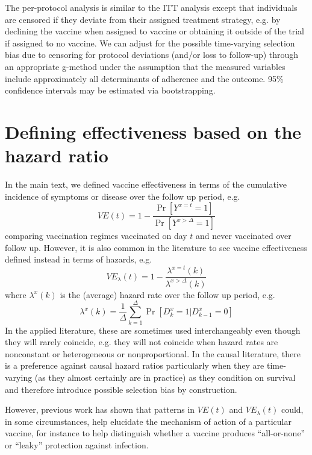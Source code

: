 \begin{appendices}
\begin{refsection}
    The per-protocol analysis is similar to the ITT analysis except that individuals are censored if they deviate from their assigned treatment strategy, e.g. by declining the vaccine when assigned to vaccine or obtaining it outside of the trial if assigned to no vaccine. We can adjust for the possible time-varying selection bias due to censoring for protocol deviations (and/or loss to follow-up) through an appropriate g-method under the assumption that the measured variables include approximately all determinants of adherence and the outcome. 95\% confidence intervals may be estimated via bootstrapping. 
    \clearpage

    \section{Defining effectiveness based on the hazard ratio} \label{sec:effect_measures}
    In the main text, we defined vaccine effectiveness in terms of the cumulative incidence of symptoms or disease over the follow up period, e.g.
    $$
    VE(t) = 1 - \frac{\Pr[Y^{x=t} = 1]}{\Pr[Y^{x > \Delta} = 1]}
    $$ 
    comparing vaccination regimes vaccinated on day $t$ and never vaccinated over follow up. However, it is also common in the literature to see vaccine effectiveness defined instead in terms of hazards, e.g.
    $$
    VE_\lambda(t) = 1 - \frac{\lambda^{x=t}(k)}{\lambda^{x > \Delta}(k)}
    $$ 
    where $\lambda^x(k)$ is the (average) hazard rate over the follow up period, e.g.
    $$
    \lambda^x(k) = \frac{1}{\Delta}\sum_{k=1}^{\Delta}\Pr[D_k^{x} = 1 | D_{k-1}^{x} = 0]
    $$ 
    In the applied literature, these are sometimes used interchangeably even though they will rarely coincide, e.g. they will not coincide when hazard rates are nonconstant or heterogeneous or nonproportional. In the causal literature, there is a preference against causal hazard ratios particularly when they are time-varying (as they almost certainly are in practice) as they condition on survival and therefore introduce possible selection bias by construction. 

    However, previous work \cite{smith_assessment_1984} has shown that patterns in $VE(t)$ and $VE_\lambda(t)$ could, in some circumstances, help elucidate the mechanism of action of a particular vaccine, for instance to help distinguish whether a vaccine produces ``all-or-none'' or ``leaky'' protection against infection. 

    \clearpage
    

    \clearpage
    

\end{refsection}
\end{appendices}
